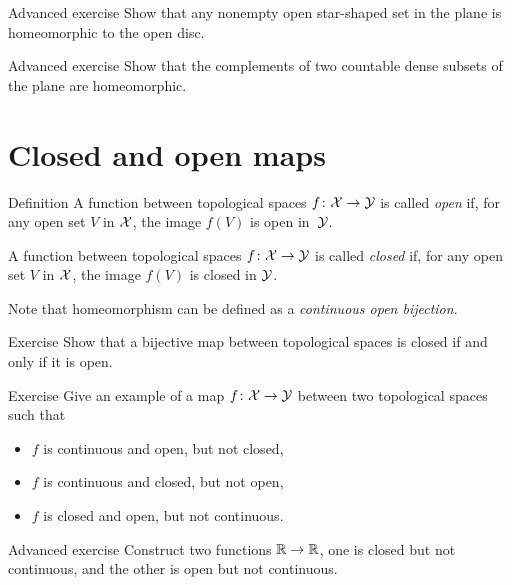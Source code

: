\begin{thm}{Advanced exercise}
Show that any nonempty open star-shaped set in the plane is homeomorphic to the open disc.
\end{thm}

\begin{thm}{Advanced exercise}
Show that the complements of two countable dense subsets of the plane are homeomorphic.
\end{thm}

\section{Closed and open maps}

\begin{thm}{Definition}\label{def:cont-top}
A function between topological spaces 
$f\colon\mathcal{X}\to\mathcal{Y}$ is called \emph{open} if, for any open set $V$ in $\mathcal{X}$, the image $f(V)$ is open in~$\mathcal{Y}$.

A function between topological spaces 
$f\colon\mathcal{X}\to\mathcal{Y}$ is called \emph{closed} if, for any open set $V$ in $\mathcal{X}$, the image $f(V)$ is closed in $\mathcal{Y}$.
\end{thm}

Note that homeomorphism can be defined as a \emph{continuous open bijection}.

\begin{thm}{Exercise}
Show that a bijective map between topological spaces is closed if and only if it is open.
\end{thm}

\begin{thm}{Exercise}
Give an example of a map $f\colon\mathcal{X}\to\mathcal{Y}$ between two topological spaces such that 
\begin{itemize}
 \item $f$ is continuous and open, but not closed,
 \item $f$ is continuous and closed, but not open,
 \item $f$ is closed and open, but not continuous.
\end{itemize}

\end{thm}

\begin{thm}{Advanced exercise}
Construct two functions $\mathbb{R}\to\mathbb{R}$, one is closed but not continuous, and the other is open but not continuous.
\end{thm}


